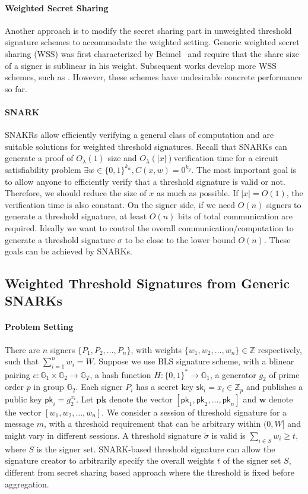 \paragraph{Weighted Secret Sharing} Another approach is to modify the secret sharing part in unweighted threshold signature schemes to accommodate the weighted setting. Generic weighted secret sharing (WSS) was first characterized by Beimel~\cite{DBLP:conf/tcc/BeimelTW05} and require that the share size of a signer is sublinear in his weight. Subsequent works develop more WSS schemes, such as \cite{DBLP:conf/crypto/GargJMSWZ23}. However, these schemes have undesirable concrete performance so far. 

\paragraph{SNARK} SNAKRs allow efficiently verifying a general class of computation and are suitable solutions for weighted threshold signatures. Recall that SNARKs can generate a proof of $O_\lambda(1)$ size and $O_\lambda(|x|)$verification time for a circuit satisfiability problem $\exists w\in\{0,1\}^{k_w}, C(x, w)=0^{k_y}$. The most important goal is to allow anyone to efficiently verify that a threshold signature is valid or not. Therefore, we should reduce the size of $x$ as much as possible. If $|x| = O(1)$, the verification time is also constant. On the signer side, if we need $O(n)$ signers to generate a threshold signature, at least $O(n)$ bits of total communication are required. Ideally we want to control the overall communication/computation to generate a threshold signature $\sigma$ to be close to the lower bound $O(n)$. These goals can be achieved by SNARKs. 

\subsection{Weighted Threshold Signatures from Generic SNARKs}
\paragraph{Problem Setting} There are $n$ signers $\{P_1, P_2, \dots, P_n\}$, with weights $\{w_1,w_2,\dots, w_n\}\in \mathbb{Z}$ respectively, such that $\sum_{i=1}^n w_i = W$. Suppose we use BLS signature scheme, with a blinear pairing $e:\mathbb{G}_1\times \mathbb{G}_2\to \mathbb{G}_T$, a hash function $H:\{0,1\}^\ast\to \mathbb{G}_1$, a generator $g_2$ of prime order $p$ in group $\mathbb{G}_2$. Each signer $P_i$ has a secret key $\mathsf{sk}_i = x_i \in \mathbb{Z}_p$ and publishes a public key $\mathsf{pk}_i = g_2^{x_i}$. Let $\mathbf{pk}$ denote the vector $[\mathsf{pk}_1,\mathsf{pk}_2,\dots, \mathsf{pk}_n]$ and $\mathbf{w}$ denote the vector $[w_1,w_2,\dots, w_n]$. We consider a session of threshold signature for a message $m$, with a threshold requirement that can be arbitrary within $(0, W]$ and might vary in different sessions. A threshold signature $\tilde{\sigma}$ is valid is $\sum_{i\in S}w_i\ge t$, where $S$ is the signer set. SNARK-based threshold signature can allow the signature creator to arbitrarily specify the overall weights $t$ of the signer set $S$, different from secret sharing based approach where the threshold is fixed before aggregation. 

